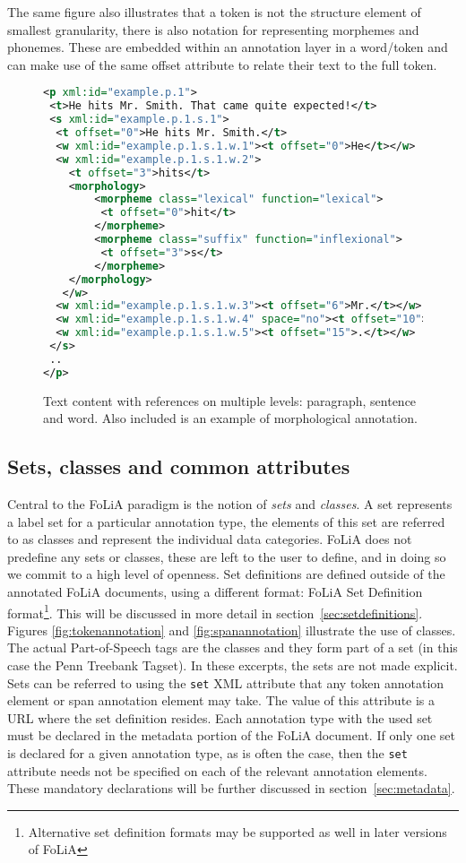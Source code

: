 \documentclass[a4paper,10pt,twoside]{article}
\begin{document}
The same figure also illustrates that a token is not the structure element of
smallest granularity, there is also notation for representing morphemes and
phonemes. These are embedded within an annotation layer in a word/token and
can make use of the same offset attribute to relate their text to the full token.

\begin{figure}[tbh]

\label{fig:textcontent}
\begin{lstlisting}[language=xml]
<p xml:id="example.p.1">
 <t>He hits Mr. Smith. That came quite expected!</t>
 <s xml:id="example.p.1.s.1">
  <t offset="0">He hits Mr. Smith.</t>
  <w xml:id="example.p.1.s.1.w.1"><t offset="0">He</t></w>
  <w xml:id="example.p.1.s.1.w.2">
    <t offset="3">hits</t>
    <morphology> 
        <morpheme class="lexical" function="lexical">
         <t offset="0">hit</t>
        </morpheme>
        <morpheme class="suffix" function="inflexional">
         <t offset="3">s</t>
        </morpheme>
    </morphology>
   </w>
  <w xml:id="example.p.1.s.1.w.3"><t offset="6">Mr.</t></w>
  <w xml:id="example.p.1.s.1.w.4" space="no"><t offset="10">Smith</t></w>
  <w xml:id="example.p.1.s.1.w.5"><t offset="15">.</t></w>
 </s>
 ..
</p>
\end{lstlisting}
\caption{Text content with references on multiple levels: paragraph, sentence
and word. Also included is an example of morphological annotation.}
\end{figure}


\subsection{Sets, classes and common attributes}

Central to the FoLiA paradigm is the notion of \emph{sets} and \emph{classes}.
A set represents a label set for a particular annotation type, the elements of
this set are referred to as classes and represent the individual data
categories. FoLiA does not predefine any sets or classes, these are left to the
user to define, and in doing so we commit to a high level of openness. Set
definitions are defined outside of the annotated FoLiA documents, using a
different format: FoLiA Set Definition format\footnote{Alternative set
definition formats may be supported as well in later versions of FoLiA}. This
will be discussed in more detail in section~\ref{sec:setdefinitions}. Figures
\ref{fig:tokenannotation} and \ref{fig:spanannotation} illustrate the use of
classes. The actual Part-of-Speech tags are the classes and they form part of a
set (in this case the Penn Treebank Tagset). In these excerpts, the sets are
not made explicit. Sets can be referred to using the \texttt{set} XML attribute
that any token annotation element or span annotation element may take. The
value of this attribute is a URL where the set definition resides. Each
annotation type with the used set must be declared in the metadata portion of
the FoLiA document. If only one set is declared for a given annotation type, as
is often the case, then the \texttt{set} attribute needs not be specified on
each of the relevant annotation elements. These mandatory declarations will be
further discussed in section~\ref{sec:metadata}. 
\end{document}

